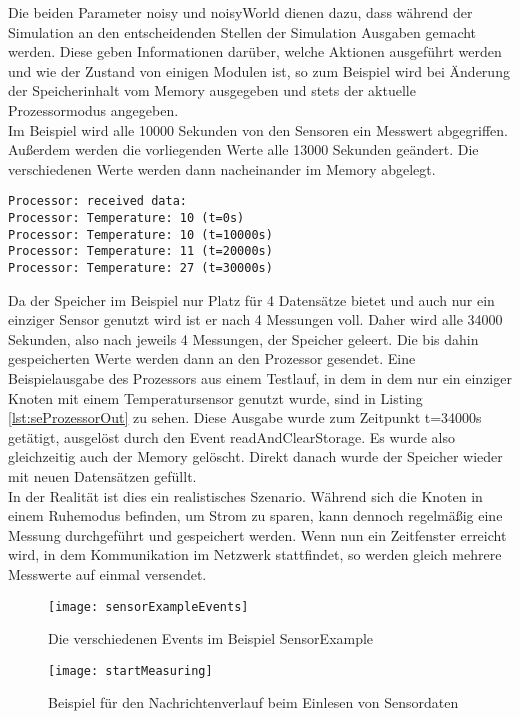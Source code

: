 Die beiden Parameter noisy und noisyWorld dienen dazu, dass während der Simulation an den entscheidenden Stellen der Simulation Ausgaben gemacht werden. Diese geben Informationen darüber, welche Aktionen ausgeführt werden und wie der Zustand von einigen Modulen ist, so zum Beispiel wird bei Änderung der Speicherinhalt vom Memory ausgegeben und stets der aktuelle Prozessormodus angegeben.\\
Im Beispiel wird alle 10000 Sekunden von den Sensoren ein Messwert abgegriffen. Außerdem werden die vorliegenden Werte alle 13000 Sekunden geändert. Die verschiedenen Werte werden dann nacheinander im Memory abgelegt.\\
\begin{lstlisting}[language=ned,caption={Ausgabe vom Prozessor bei t=40000s},label=lst:seProzessorOut]
Processor: received data:
Processor: Temperature: 10 (t=0s)
Processor: Temperature: 10 (t=10000s)
Processor: Temperature: 11 (t=20000s)
Processor: Temperature: 27 (t=30000s)
\end{lstlisting}
Da der Speicher im Beispiel nur Platz für 4 Datensätze bietet und auch nur ein einziger Sensor genutzt wird ist er nach 4 Messungen voll. Daher wird alle 34000 Sekunden, also nach jeweils 4 Messungen, der Speicher geleert. Die bis dahin gespeicherten Werte werden dann an den Prozessor gesendet. Eine Beispielausgabe des Prozessors aus einem Testlauf, in dem in dem nur ein einziger Knoten mit einem Temperatursensor genutzt wurde, sind in Listing \ref{lst:seProzessorOut} zu sehen. Diese Ausgabe wurde zum Zeitpunkt t=34000s getätigt, ausgelöst durch den Event readAndClearStorage. Es wurde also gleichzeitig auch der Memory gelöscht. Direkt danach wurde der Speicher wieder mit neuen Datensätzen gefüllt.\\
In der Realität ist dies ein realistisches Szenario. Während sich die Knoten in einem Ruhemodus befinden, um Strom zu sparen, kann dennoch regelmäßig eine Messung durchgeführt und gespeichert werden. Wenn nun ein Zeitfenster erreicht wird, in dem Kommunikation im Netzwerk stattfindet, so werden gleich mehrere Messwerte auf einmal versendet.

\begin{figure}[htbp]
\centering
\caption{Die verschiedenen Events im Beispiel SensorExample}
\label{fig:seEvents}
\texttt{[image: sensorExampleEvents]}
\end{figure}

\begin{figure}[htbp]
\centering
\caption{Beispiel für den Nachrichtenverlauf beim Einlesen von Sensordaten}
\label{fig:seStartMeasuring}
\texttt{[image: startMeasuring]}
\end{figure}

